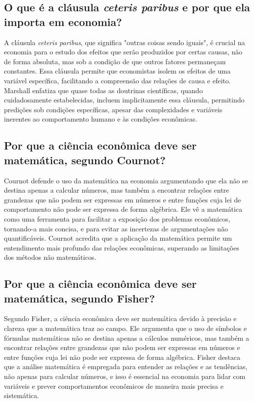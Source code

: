 \documentclass[12pt]{article}
\begin{document}
\subsection{\textbf{O que é a cláusula \textit{ceteris paribus} e por que ela importa em economia?}}
A cláusula \textit{ceteris paribus}, que significa "outras coisas sendo iguais", é crucial na economia para o estudo dos efeitos que serão produzidos por certas causas, não de forma absoluta, mas sob a condição de que outros fatores permaneçam constantes. Essa cláusula permite que economistas isolem os efeitos de uma variável específica, facilitando a compreensão das relações de causa e efeito. Marshall enfatiza que quase todas as doutrinas científicas, quando cuidadosamente estabelecidas, incluem implicitamente essa cláusula, permitindo predições sob condições específicas, apesar das complexidades e variáveis inerentes ao comportamento humano e às condições econômicas.
\subsection{\textbf{Por que a ciência econômica deve ser matemática, segundo Cournot?}}
Cournot defende o uso da matemática na economia argumentando que ela não se destina apenas a calcular números, mas também a encontrar relações entre grandezas que não podem ser expressas em números e entre funções cuja lei de comportamento não pode ser expressa de forma algébrica. Ele vê a matemática como uma ferramenta para facilitar a exposição dos problemas econômicos, tornando-a mais concisa, e para evitar as incertezas de argumentações não quantificáveis. Cournot acredita que a aplicação da matemática permite um entendimento mais profundo das relações econômicas, superando as limitações dos métodos não matemáticos.
\subsection{\textbf{Por que a ciência econômica deve ser matemática, segundo Fisher?}}
Segundo Fisher, a ciência econômica deve ser matemática devido à precisão e clareza que a matemática traz ao campo. Ele argumenta que o uso de símbolos e fórmulas matemáticas não se destina apenas a cálculos numéricos, mas também a encontrar relações entre grandezas que não podem ser expressas em números e entre funções cuja lei não pode ser expressa de forma algébrica. Fisher destaca que a análise matemática é empregada para entender as relações e as tendências, não apenas para calcular números, e isso é essencial na economia para lidar com variáveis e prever comportamentos econômicos de maneira mais precisa e sistemática.
\end{document}

